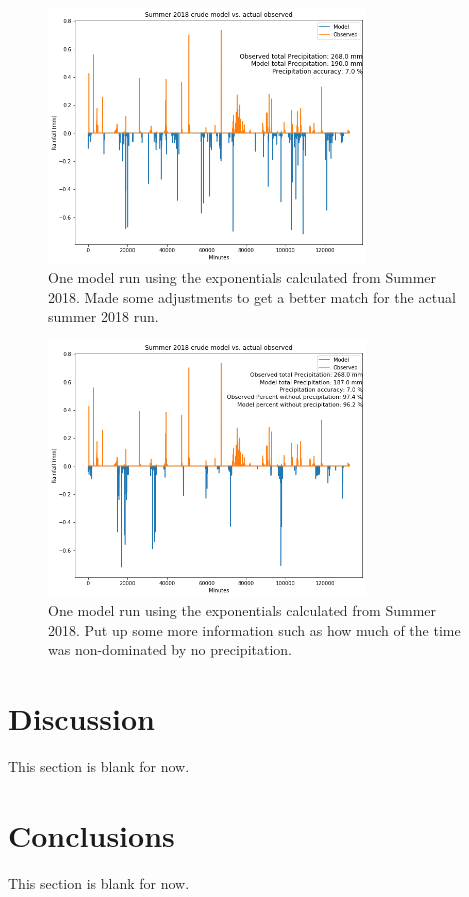 \documentclass[11pt]{report}
\begin{document}
\clearpage
\begin{figure}[t]
	\centering
	\includegraphics[width=0.75\textwidth]{Figures/best_one_run.png}
	\caption[Modified run using Summer 2018 climatology]
	{\label{crudermodel} One model run using the exponentials calculated from Summer 2018. Made some adjustments to get a better match for the actual summer 2018 run.}
\end{figure}

\clearpage
\begin{figure}[t]
	\centering
	\includegraphics[width=0.75\textwidth]{Figures/run_with_more_info.png}
	\caption[More  run using Summer 2018 climatology]
	{\label{crudesmodel} One model run using the exponentials calculated from Summer 2018. Put up some more information such as how much of the time was non-dominated by no precipitation. }
\end{figure}


\section{Discussion\label{sec:discussion}}
This section is blank for now. 

\section{Conclusions\label{sec:conclusions}}
This section is blank for now. 

\small
\renewcommand{\bibsep}{0em}

\renewcommand{\bibname}{References}


\end{document}
